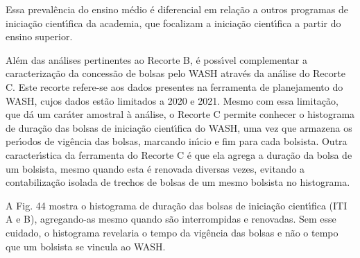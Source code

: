 \documentclass[
12pt,		%
openright,	%
twoside,  %
a4paper,			%
chapter=TITLE,		%
english,			%
french,				%
spanish,			%
brazil				%
]{USPSC-classe/USPSC}
\begin{document}
Essa preval\^encia do ensino m\'edio \'e diferencial em rela\c{c}\~ao a outros programas de inicia\c{c}\~ao cient\'{\i}fica da academia, que focalizam a inicia\c{c}\~ao cient\'{\i}fica a partir do ensino superior.









Al\'em das an\'alises pertinentes ao Recorte B, \'e poss\'{\i}vel complementar a caracteriza\c{c}\~ao da concess\~ao de bolsas pelo WASH atrav\'es da an\'alise do Recorte C. Este recorte refere-se aos dados presentes na ferramenta de planejamento do WASH, cujos dados est\~ao limitados a 2020 e 2021. Mesmo com essa limita\c{c}\~ao, que d\'a um car\'ater amostral \`a an\'alise, o Recorte C permite conhecer o histograma de dura\c{c}\~ao das bolsas de inicia\c{c}\~ao cient\'{\i}fica do WASH, uma vez que armazena os per\'{\i}odos de vig\^encia das bolsas, marcando in\'{\i}cio e fim para cada bolsista. Outra caracter\'{\i}stica da ferramenta do Recorte C \'e que ela agrega a dura\c{c}\~ao da bolsa de um bolsista, mesmo quando esta \'e renovada diversas vezes, evitando a contabiliza\c{c}\~ao isolada de trechos de bolsas de um mesmo bolsista no histograma.









A Fig. 44 mostra o histograma de dura\c{c}\~ao das bolsas de inicia\c{c}\~ao cient\'{\i}fica (ITI A e B), agregando-as mesmo quando s\~ao interrompidas e renovadas. Sem esse cuidado, o histograma revelaria o tempo da vig\^encia das bolsas e n\~ao o tempo que um bolsista se vincula ao WASH.
\end{document}
